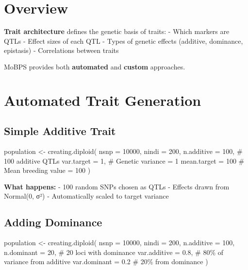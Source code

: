 \documentclass[
  letterpaper,
]{book}
\newenvironment{Shaded}{\begin{snugshade}}{\end{snugshade}}
\newcommand{\AttributeTok}[1]{\textcolor[rgb]{0.40,0.45,0.13}{#1}}
\newcommand{\CommentTok}[1]{\textcolor[rgb]{0.37,0.37,0.37}{#1}}
\newcommand{\DecValTok}[1]{\textcolor[rgb]{0.68,0.00,0.00}{#1}}
\newcommand{\FloatTok}[1]{\textcolor[rgb]{0.68,0.00,0.00}{#1}}
\newcommand{\FunctionTok}[1]{\textcolor[rgb]{0.28,0.35,0.67}{#1}}
\newcommand{\NormalTok}[1]{\textcolor[rgb]{0.00,0.23,0.31}{#1}}
\newcommand{\OtherTok}[1]{\textcolor[rgb]{0.00,0.23,0.31}{#1}}
\begin{document}
\section{Overview}\label{overview}

\textbf{Trait architecture} defines the genetic basis of traits: - Which
markers are QTLs - Effect sizes of each QTL - Types of genetic effects
(additive, dominance, epistasis) - Correlations between traits

MoBPS provides both \textbf{automated} and \textbf{custom} approaches.

\section{Automated Trait Generation}\label{sec-auto-traits}

\subsection{Simple Additive Trait}\label{simple-additive-trait}

\begin{Shaded}
\begin{Highlighting}[]
\NormalTok{population }\OtherTok{\textless{}{-}} \FunctionTok{creating.diploid}\NormalTok{(}
  \AttributeTok{nsnp =} \DecValTok{10000}\NormalTok{,}
  \AttributeTok{nindi =} \DecValTok{200}\NormalTok{,}
  \AttributeTok{n.additive =} \DecValTok{100}\NormalTok{,      }\CommentTok{\# 100 additive QTLs}
  \AttributeTok{var.target =} \DecValTok{1}\NormalTok{,        }\CommentTok{\# Genetic variance = 1}
  \AttributeTok{mean.target =} \DecValTok{100}      \CommentTok{\# Mean breeding value = 100}
\NormalTok{)}
\end{Highlighting}
\end{Shaded}

\textbf{What happens:} - 100 random SNPs chosen as QTLs - Effects drawn
from Normal(0, σ²) - Automatically scaled to target variance

\subsection{Adding Dominance}\label{adding-dominance}

\begin{Shaded}
\begin{Highlighting}[]
\NormalTok{population }\OtherTok{\textless{}{-}} \FunctionTok{creating.diploid}\NormalTok{(}
  \AttributeTok{nsnp =} \DecValTok{10000}\NormalTok{,}
  \AttributeTok{nindi =} \DecValTok{200}\NormalTok{,}
  \AttributeTok{n.additive =} \DecValTok{100}\NormalTok{,}
  \AttributeTok{n.dominant =} \DecValTok{20}\NormalTok{,       }\CommentTok{\# 20 loci with dominance}
  \AttributeTok{var.additive =} \FloatTok{0.8}\NormalTok{,    }\CommentTok{\# 80\% of variance from additive}
  \AttributeTok{var.dominant =} \FloatTok{0.2}     \CommentTok{\# 20\% from dominance}
\NormalTok{)}
\end{Highlighting}
\end{Shaded}
\end{document}
